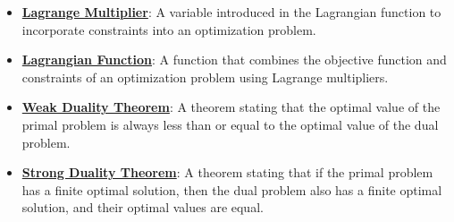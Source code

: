 \documentclass{article}%
\begin{document}
\begin{itemize}[leftmargin=*]%
\item \href{https://www.math.purdue.edu/~yipn/421//2024-09-17-DualityGeneral.pdf#page=2}{\textbf{Lagrange Multiplier}}: A variable introduced in the Lagrangian function to incorporate constraints into an optimization problem.%
\item \href{https://www.math.purdue.edu/~yipn/421//2024-09-17-DualityGeneral.pdf#page=2}{\textbf{Lagrangian Function}}: A function that combines the objective function and constraints of an optimization problem using Lagrange multipliers.%
\item \href{https://www.math.purdue.edu/~yipn/421//2024-09-17-DualityGeneral.pdf#page=5}{\textbf{Weak Duality Theorem}}: A theorem stating that the optimal value of the primal problem is always less than or equal to the optimal value of the dual problem.%
\item \href{https://www.math.purdue.edu/~yipn/421//2024-09-17-DualityGeneral.pdf#page=17}{\textbf{Strong Duality Theorem}}: A theorem stating that if the primal problem has a finite optimal solution, then the dual problem also has a finite optimal solution, and their optimal values are equal.%
\end{itemize}%
\end{document}
